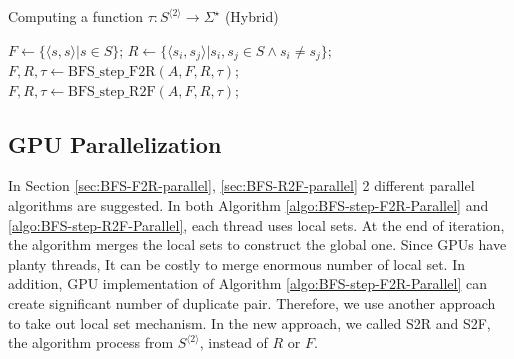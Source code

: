 \documentclass[12pt]{article}
\newcommand{\comment}[2]{{\color{red}{\bf (#1: #2)}}}
\begin{document}
\begin{algorithm}[ht]
	\label{algo:BFS-Hybrid}
	\caption{Computing a function $\tau : S^{\langle 2 \rangle} \rightarrow \Sigma^\star$ (Hybrid)}
	
	
	
	$F \longleftarrow \{ \langle s,s\rangle | s \in S \}$; 
	$R \longleftarrow \{ \langle s_i,s_j\rangle | s_i,s_j \in S \wedge s_i \neq s_j \}$;
	{
		{
			$F,R,\tau \longleftarrow \mbox{BFS\_step\_F2R}(A,F,R,\tau)$;\\
		}
		\Else
		{
			$F,R,\tau \longleftarrow \mbox{BFS\_step\_R2F}(A,F,R,\tau)$;\\
		}
	}
\end{algorithm}

\subsection{GPU Parallelization}
\label{sec:BFS-GPU}
\comment{sertac}{intro olarak GPU mimariden burada mi bahsetmeli?}
In Section \ref{sec:BFS-F2R-parallel}, \ref{sec:BFS-R2F-parallel} 2 different parallel algorithms are suggested. In both Algorithm \ref{algo:BFS-step-F2R-Parallel} and \ref{algo:BFS-step-R2F-Parallel}, each thread uses local sets. At the end of iteration, the algorithm merges the local sets to construct the global one. Since GPUs have planty threads, It can be costly to merge enormous number of local set. In addition, GPU implementation of Algorithm \ref{algo:BFS-step-F2R-Parallel} can create significant number of duplicate pair. Therefore, we use another approach to take out local set mechanism. \comment{sertac}{bu konuda birilerine cite etmek gerekebilir. Daha once benzer isi yapmis olan paperlar konulabilir. Paper bulmam lazim.} In the new approach, we called S2R and S2F, the algorithm process from $S^{\langle 2 \rangle}$, instead of $R$ or $F$.
\end{document}

